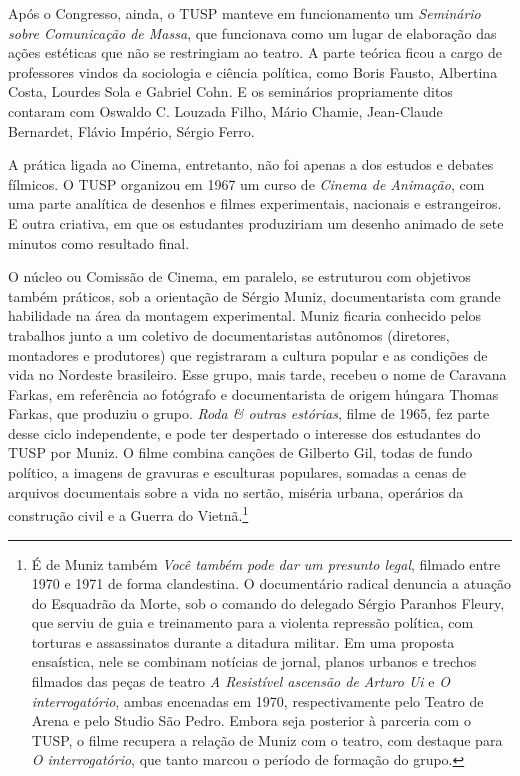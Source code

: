 Após o Congresso, ainda, o TUSP manteve em funcionamento um
\textit{Seminário sobre Comunicação de Massa}, que funcionava como um lugar
de elaboração das ações estéticas que não se restringiam ao teatro. A
parte teórica ficou a cargo de professores vindos da sociologia e
ciência política, como Boris Fausto, Albertina Costa, Lourdes Sola e
Gabriel Cohn. E os seminários propriamente ditos contaram com Oswaldo C.
Louzada Filho, Mário Chamie, Jean-Claude Bernardet, Flávio Império,
Sérgio Ferro.

A prática ligada ao Cinema, entretanto, não foi apenas a dos estudos e
debates fílmicos. O TUSP organizou em 1967 um curso de \textit{Cinema de
Animação}, com uma parte analítica de desenhos e filmes experimentais,
nacionais e estrangeiros. E outra criativa, em que os estudantes
produziriam um desenho animado de sete minutos como resultado final.

O núcleo ou Comissão de Cinema, em paralelo, se estruturou com objetivos
também práticos, sob a orientação de Sérgio Muniz, documentarista com
grande habilidade na área da montagem experimental. Muniz ficaria
conhecido pelos trabalhos junto a um coletivo de documentaristas
autônomos (diretores, montadores e produtores) que registraram a cultura
popular e as condições de vida no Nordeste brasileiro. Esse grupo, mais
tarde, recebeu o nome de Caravana Farkas, em referência ao fotógrafo e
documentarista de origem húngara Thomas Farkas, que produziu o grupo.
\textit{Roda \& outras estórias}, filme de 1965, fez parte desse ciclo
independente, e pode ter despertado o interesse dos estudantes do TUSP
por Muniz. O filme combina canções de Gilberto Gil, todas de fundo
político, a imagens de gravuras e esculturas populares, somadas a cenas
de arquivos documentais sobre a vida no sertão, miséria urbana,
operários da construção civil e a Guerra do Vietnã.\footnote{É de Muniz
  também \textit{Você também pode dar um presunto legal}, filmado entre
  1970 e 1971 de forma clandestina. O documentário radical denuncia a
  atuação do Esquadrão da Morte, sob o comando do delegado Sérgio
  Paranhos Fleury, que serviu de guia e treinamento para a violenta
  repressão política, com torturas e assassinatos durante a ditadura
  militar. Em uma proposta ensaística, nele se combinam notícias de
  jornal, planos urbanos e trechos filmados das peças de teatro \textit{A
  Resistível ascensão de Arturo Ui} e \textit{O interrogatório}, ambas
  encenadas em 1970, respectivamente pelo Teatro de Arena e pelo Studio
  São Pedro. Embora seja posterior à parceria com o TUSP, o filme
  recupera a relação de Muniz com o teatro, com destaque para \textit{O
  interrogatório}, que tanto marcou o período de formação do grupo.}


